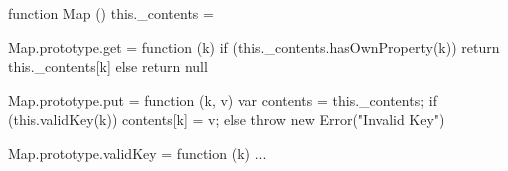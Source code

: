  
 
 \begin{lstjs}[firstnumber=1]
function Map () { this._contents = {} }

Map.prototype.get = function (k) {
    if (this._contents.hasOwnProperty(k)) { 
        return this._contents[k] 
    } else { return null }  
}

Map.prototype.put = function (k, v) {
   var contents = this._contents;
   if (this.validKey(k)) { 
       contents[k] = v; 
   } else { throw new Error("Invalid Key") } 
} 

Map.prototype.validKey = function (k) { ... }
\end{lstjs}